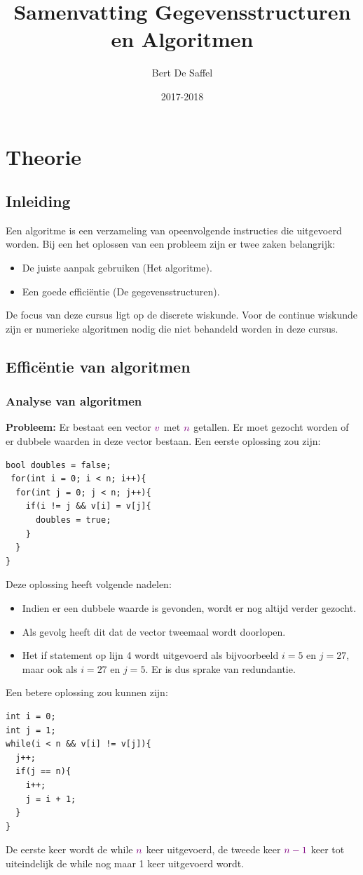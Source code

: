 \documentclass[12pt]{report}
\title{Samenvatting Gegevensstructuren en Algoritmen}
\author{Bert De Saffel}
\date{2017-2018}
\newcommand{\note}[1]{
  \color{violet}#1 \color{black}
}
\begin{document}
\maketitle
\tableofcontents

\part{Theorie}
\chapter{Inleiding}
Een algoritme is een verzameling van opeenvolgende instructies die uitgevoerd worden. Bij een het oplossen van een probleem zijn er twee zaken belangrijk:
\begin{itemize}
 \item De juiste aanpak gebruiken (Het algoritme).
 \item Een goede efficiëntie (De gegevensstructuren).
\end{itemize}
De focus van deze cursus ligt op de discrete wiskunde. Voor de continue wiskunde zijn er numerieke algoritmen nodig die niet behandeld worden in deze cursus.
\chapter{Efficëntie van algoritmen}
\section{Analyse van algoritmen}
\textbf{Probleem:} Er bestaat een vector $\note{v}$ met $\note{n}$ getallen. Er moet gezocht worden of er dubbele waarden in deze vector bestaan. Een eerste oplossing zou zijn:
\begin{lstlisting}
bool doubles = false;
 for(int i = 0; i < n; i++){
  for(int j = 0; j < n; j++){
    if(i != j && v[i] = v[j]{
      doubles = true;
    }
  }
}
\end{lstlisting}
Deze oplossing heeft volgende nadelen:
\begin{itemize}
 \item Indien er een dubbele waarde is gevonden, wordt er nog altijd verder gezocht.
 \item Als gevolg heeft dit dat de vector tweemaal wordt doorlopen.
 \item Het if statement op lijn 4 wordt uitgevoerd als bijvoorbeeld $i = 5$ en $j = 27$, maar ook als $i = 27$ en $j = 5$. Er is dus sprake van redundantie.
\end{itemize}
Een betere oplossing zou kunnen zijn:
\begin{lstlisting}
int i = 0;
int j = 1;
while(i < n && v[i] != v[j]){
  j++;
  if(j == n){
    i++;
    j = i + 1;
  }
}
\end{lstlisting}
De eerste keer wordt de while $\note{n}$ keer uitgevoerd, de tweede keer $\note{n - 1}$ keer tot uiteindelijk de while nog maar 1 keer uitgevoerd wordt. 
\end{document}
